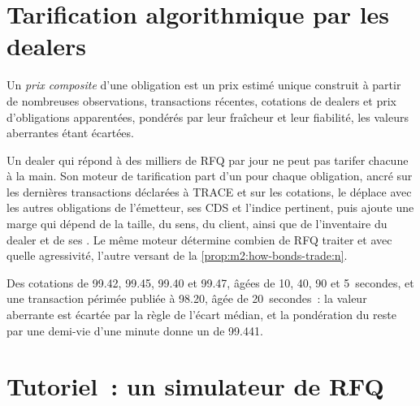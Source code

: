 \section{Tarification algorithmique par les dealers}

\begin{definition}\label{def:m2:how-bonds-trade:composite}
Un \emph{prix composite} d'une obligation est un prix estimé unique
construit à partir de nombreuses observations, transactions récentes, cotations de dealers et prix d'obligations apparentées,
pondérés par leur fraîcheur et leur fiabilité, les valeurs aberrantes étant écartées.
\end{definition}

Un dealer qui répond à des milliers de RFQ par jour ne peut pas tarifer chacune à la main. Son moteur de tarification
part d'un  pour chaque obligation, ancré sur les dernières transactions déclarées à
TRACE et sur les cotations, le déplace avec les autres obligations de l'émetteur, ses CDS et l'indice
pertinent, puis ajoute une marge qui dépend de la taille, du sens, du
client, ainsi que de l'inventaire du dealer et de ses . Le même moteur détermine combien de RFQ traiter et
avec quelle agressivité, l'autre versant de la
\cref{prop:m2:how-bonds-trade:n}.

\begin{example}\label{ex:m2:how-bonds-trade:composite}
Des cotations de 99.42, 99.45, 99.40 et 99.47, âgées de 10, 40, 90 et 5~secondes, et une
transaction périmée publiée à 98.20, âgée de 20~secondes~: la valeur aberrante est écartée par la règle de l'écart médian,
et la pondération du reste par une demi-vie d'une minute donne un  de 99.441.
\end{example}

\section{Tutoriel~: un simulateur de RFQ}\label{tut:m2:how-bonds-trade:rfq}

